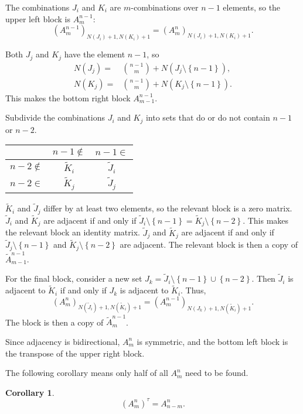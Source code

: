 \documentclass[a0paper,portrait,final]{baposter}
\newcommand{\set}[1]{\left \{ #1 \right \}}
\newtheorem{corollary}{Corollary}
\begin{document}
\begin{poster}
{\begin{multicols}{2}
The combinations $J_i$ and $K_i$ are $m$-combinations over $n-1$ elements, so the upper left block is $A_m^{n-1}$:
\begin{equation*}
\left ( A_m^{n-1} \right )_{N(J_i)+1,N(K_i)+1} = \left ( A_m^n \right )_{N(J_i)+1,N(K_i)+1}.
\end{equation*}

Both $J_j$ and $K_j$ have the element $n-1$, so
\begin{align*}
N(J_j) = & \binom{n-1}{m} + N(J_j \setminus \set{n-1}), \\
N(K_j) = & \binom{n-1}{m} + N(K_j \setminus \set{n-1}).
\end{align*}
This makes the bottom right block $A_{m-1}^{n-1}$.

Subdivide the combinations $J_i$ and $K_j$ into sets that do or do not contain $n-1$ or $n-2$.
\begin{center}
\begin{tabular}{r | c c}
	& $n-1 \notin$ & $n-1 \in$ \\ \hline
	$n-2 \notin$ & $\tilde{K}_i$ & $\tilde{J}_i$ \\
	$n-2 \in$ & $\tilde{K}_j$ & $\tilde{J}_j$
\end{tabular}
\end{center}
$\tilde{K}_i$ and $\tilde{J}_j$ differ by at least two elements, so the relevant block is a zero matrix.
$\tilde{J}_i$ and $\tilde{K}_j$ are adjacent if and only if $\tilde{J}_i \setminus \set{n-1} = \tilde{K}_j \setminus \set{n-2}$.
This makes the relevant block an identity matrix.
$\tilde{J}_j$ and $\tilde{K}_j$ are adjacent if and only if $\tilde{J}_j \setminus \set{n-1}$ and $\tilde{K}_j \setminus \set{n-2}$ are adjacent.
The relevant block is then a copy of $\tilde{A}_{m-1}^{n-1}$.

For the final block, consider a new set $J_k = \tilde{J}_i \setminus \set{n-1} \cup \set{n-2}$.
Then $\tilde{J}_i$ is adjacent to $\tilde{K}_i$ if and only if $J_k$ is adjacent to $\tilde{K}_i$.
Thus,
\begin{equation*}
\left ( A_m^n \right )_{N(\tilde{J}_i)+1,N(\tilde{K}_i)+1} = \left ( A_m^{n-1} \right )_{N(J_k)+1,N(\tilde{K}_i)+1}.
\end{equation*}
The block is then a copy of $\tilde{A}_m^{n-1}$.

Since adjacency is bidirectional, $A_m^n$ is symmetric, and the bottom left block is the transpose of the upper right block.

The following corollary means only half of all $A_m^n$ need to be found.
\begin{corollary} \label{lem: anti-transpose}
\begin{equation*}
(A_m^n)^\tau = A_{n-m}^n.
\end{equation*}
\end{corollary}
\end{multicols}
}


\end{poster}
\end{document}

